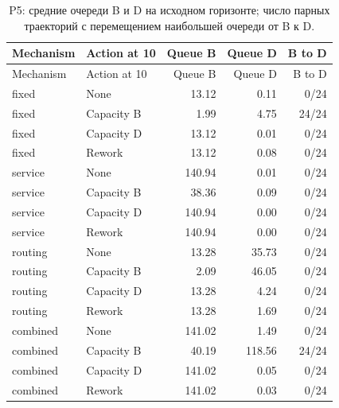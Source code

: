 \begin{longtable}{llrrr}\caption{P5: средние очереди B и D на исходном горизонте; число парных траекторий с перемещением наибольшей очереди от B к D.}\\\toprule

Mechanism & Action at 10 & Queue B & Queue D & B to D\\\midrule\endfirsthead

\toprule Mechanism & Action at 10 & Queue B & Queue D & B to D\\\midrule\endhead

fixed & None & 13.12 & 0.11 & 0/24\\

fixed & Capacity B & 1.99 & 4.75 & 24/24\\

fixed & Capacity D & 13.12 & 0.01 & 0/24\\

fixed & Rework & 13.12 & 0.08 & 0/24\\

service & None & 140.94 & 0.01 & 0/24\\

service & Capacity B & 38.36 & 0.09 & 0/24\\

service & Capacity D & 140.94 & 0.00 & 0/24\\

service & Rework & 140.94 & 0.00 & 0/24\\

routing & None & 13.28 & 35.73 & 0/24\\

routing & Capacity B & 2.09 & 46.05 & 0/24\\

routing & Capacity D & 13.28 & 4.24 & 0/24\\

routing & Rework & 13.28 & 1.69 & 0/24\\

combined & None & 141.02 & 1.49 & 0/24\\

combined & Capacity B & 40.19 & 118.56 & 24/24\\

combined & Capacity D & 141.02 & 0.05 & 0/24\\

combined & Rework & 141.02 & 0.03 & 0/24\\

\bottomrule\end{longtable}
